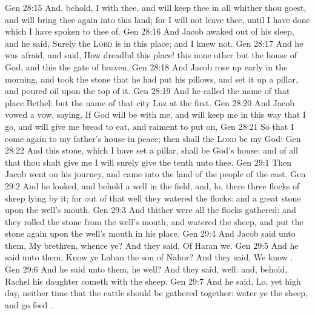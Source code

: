 \vs Gen 28:15 And, behold, I  with thee, and will keep thee in all  whither thou goest, and will bring thee again into this land; for I will not leave thee, until I have done  which I have spoken to thee of.
\vs Gen 28:16 And Jacob awaked out of his sleep, and he said, Surely the \textsc{Lord} is in this place; and I knew  not.
\vs Gen 28:17 And he was afraid, and said, How dreadful  this place! this  none other but the house of God, and this  the gate of heaven.
\vs Gen 28:18 And Jacob rose up early in the morning, and took the stone that he had put  his pillows, and set it up  a pillar, and poured oil upon the top of it.
\vs Gen 28:19 And he called the name of that place Bethel: but the name of that city  Luz at the first.
\vs Gen 28:20 And Jacob vowed a vow, saying, If God will be with me, and will keep me in this way that I go, and will give me bread to eat, and raiment to put on,
\vs Gen 28:21 So that I come again to my father's house in peace; then shall the \textsc{Lord} be my God:
\vs Gen 28:22 And this stone, which I have set  a pillar, shall be God's house: and of all that thou shalt give me I will surely give the tenth unto thee.
\vs Gen 29:1 Then Jacob went on his journey, and came into the land of the people of the east.
\vs Gen 29:2 And he looked, and behold a well in the field, and, lo, there  three flocks of sheep lying by it; for out of that well they watered the flocks: and a great stone  upon the well's mouth.
\vs Gen 29:3 And thither were all the flocks gathered: and they rolled the stone from the well's mouth, and watered the sheep, and put the stone again upon the well's mouth in his place.
\vs Gen 29:4 And Jacob said unto them, My brethren, whence  ye? And they said, Of Haran  we.
\vs Gen 29:5 And he said unto them, Know ye Laban the son of Nahor? And they said, We know .
\vs Gen 29:6 And he said unto them,  he well? And they said,  well: and, behold, Rachel his daughter cometh with the sheep.
\vs Gen 29:7 And he said, Lo,  yet high day, neither  time that the cattle should be gathered together: water ye the sheep, and go  feed .
